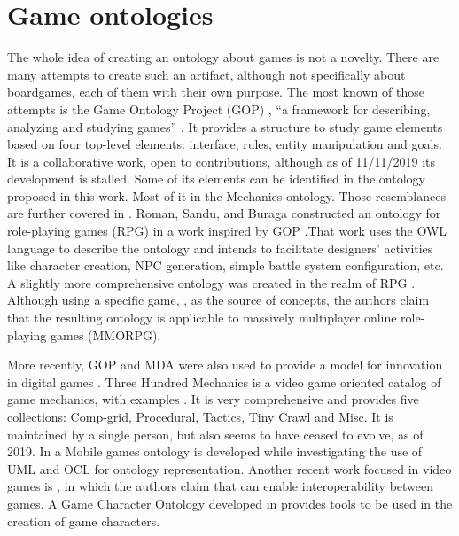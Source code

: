 \section{Game ontologies}

The whole idea of creating an ontology about games is not a novelty. There are many attempts to create such an artifact, although not specifically about boardgames, each of them with their own purpose. The most known of those attempts is the Game Ontology Project (GOP) \citep{wiki:gop}, “a framework for describing, analyzing and studying games” \citep{Zagal:2008:GOP}. It  provides  a  structure  to  study  game  elements  based  on four top-level elements:  interface,  rules,  entity manipulation and goals. It  is  a  collaborative  work,  open  to  contributions, although as of 11/11/2019 its development is stalled. Some of its elements can be identified in the ontology proposed in this work. Most of it in the Mechanics ontology. Those resemblances are further covered in \citep{kritz_buildingOntology}. Roman,  Sandu,  and  Buraga  constructed  an  ontology  for  role-playing games (RPG) in a work inspired by GOP \citep{roman2011owl}.That work uses the OWL language to describe the ontology and intends to facilitate designers’ activities like character creation, NPC generation, simple battle system configuration, etc. A slightly more comprehensive  ontology was created in the realm of RPG \citep{dhuric2015specific}. Although  using  a  specific  game,  \cite{manaworld}, as the source of concepts, the authors claim that the resulting ontology is applicable to massively multiplayer online role-playing games (MMORPG).

More recently, GOP and MDA were also used to provide a model for innovation in digital games \citep{innov:gop:mda}. Three Hundred Mechanics is a video game oriented catalog of game mechanics, with examples \citep{300gm}. It is very comprehensive and provides five collections: Comp-grid, Procedural, Tactics, Tiny Crawl and Misc. It is maintained by a single person, but also seems to have ceased to evolve, as of 2019. In \cite{leon_z._ontology_2010} a Mobile games ontology is developed while investigating the use of UML and OCL for ontology representation. Another recent work focused in video games is \cite{parkkila_ontology_2017}, in which the authors claim that can enable interoperability between games. A Game Character Ontology developed in \cite{sacco_game_2017} provides tools to be used in the creation of game characters.

